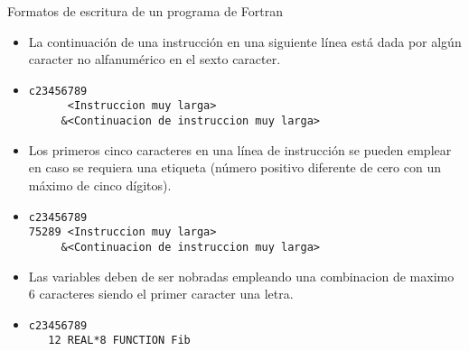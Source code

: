 \begin{frame}[fragile]{Formatos de escritura de un programa de Fortran}
   \begin{itemize}[<+(0)->]
   \item La continuación de una instrucción en una siguiente línea está dada por algún caracter no alfanumérico en el sexto caracter.
   \vspace{0.1cm}
   \item []
    \begin{verbatim}
c23456789
      <Instruccion muy larga>
     &<Continuacion de instruccion muy larga>
    \end{verbatim}
   \item Los primeros cinco caracteres en una línea de instrucción se pueden emplear en caso se requiera una etiqueta (número positivo diferente de cero con un máximo de cinco dígitos).
   \vspace{0.1cm}
   \item []
    \begin{verbatim}
c23456789
75289 <Instruccion muy larga>
     &<Continuacion de instruccion muy larga>
    \end{verbatim}
   \item Las variables deben de ser nobradas empleando una combinacion de maximo 6 caracteres siendo el primer caracter una letra.
   \item []
    \begin{verbatim}
c23456789
   12 REAL*8 FUNCTION Fib
    \end{verbatim}
  \end{itemize}
\end{frame}
